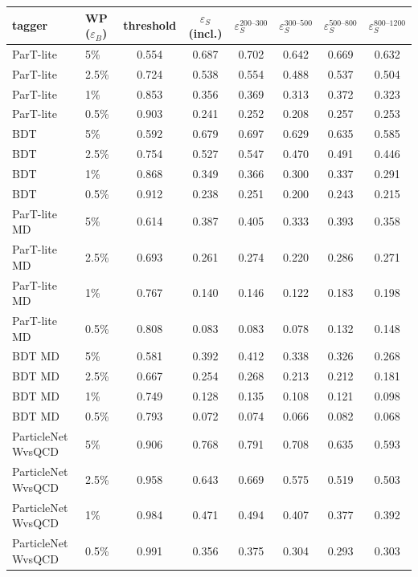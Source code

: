 \begin{tabular}{llcccccc}
\hline
tagger & WP ($\varepsilon_B$) & threshold & $\varepsilon_S$ (incl.) & $\varepsilon_S^{200\text{--}300}$ & $\varepsilon_S^{300\text{--}500}$ & $\varepsilon_S^{500\text{--}800}$ & $\varepsilon_S^{800\text{--}1200}$ \\
\hline
ParT-lite & 5\% & 0.554 & 0.687 & 0.702 & 0.642 & 0.669 & 0.632 \\
ParT-lite & 2.5\% & 0.724 & 0.538 & 0.554 & 0.488 & 0.537 & 0.504 \\
ParT-lite & 1\% & 0.853 & 0.356 & 0.369 & 0.313 & 0.372 & 0.323 \\
ParT-lite & 0.5\% & 0.903 & 0.241 & 0.252 & 0.208 & 0.257 & 0.253 \\
\hline
BDT & 5\% & 0.592 & 0.679 & 0.697 & 0.629 & 0.635 & 0.585 \\
BDT & 2.5\% & 0.754 & 0.527 & 0.547 & 0.470 & 0.491 & 0.446 \\
BDT & 1\% & 0.868 & 0.349 & 0.366 & 0.300 & 0.337 & 0.291 \\
BDT & 0.5\% & 0.912 & 0.238 & 0.251 & 0.200 & 0.243 & 0.215 \\
\hline
ParT-lite MD & 5\% & 0.614 & 0.387 & 0.405 & 0.333 & 0.393 & 0.358 \\
ParT-lite MD & 2.5\% & 0.693 & 0.261 & 0.274 & 0.220 & 0.286 & 0.271 \\
ParT-lite MD & 1\% & 0.767 & 0.140 & 0.146 & 0.122 & 0.183 & 0.198 \\
ParT-lite MD & 0.5\% & 0.808 & 0.083 & 0.083 & 0.078 & 0.132 & 0.148 \\
\hline
BDT MD & 5\% & 0.581 & 0.392 & 0.412 & 0.338 & 0.326 & 0.268 \\
BDT MD & 2.5\% & 0.667 & 0.254 & 0.268 & 0.213 & 0.212 & 0.181 \\
BDT MD & 1\% & 0.749 & 0.128 & 0.135 & 0.108 & 0.121 & 0.098 \\
BDT MD & 0.5\% & 0.793 & 0.072 & 0.074 & 0.066 & 0.082 & 0.068 \\
\hline
ParticleNet WvsQCD & 5\% & 0.906 & 0.768 & 0.791 & 0.708 & 0.635 & 0.593 \\
ParticleNet WvsQCD & 2.5\% & 0.958 & 0.643 & 0.669 & 0.575 & 0.519 & 0.503 \\
ParticleNet WvsQCD & 1\% & 0.984 & 0.471 & 0.494 & 0.407 & 0.377 & 0.392 \\
ParticleNet WvsQCD & 0.5\% & 0.991 & 0.356 & 0.375 & 0.304 & 0.293 & 0.303 \\
\hline
\end{tabular}
